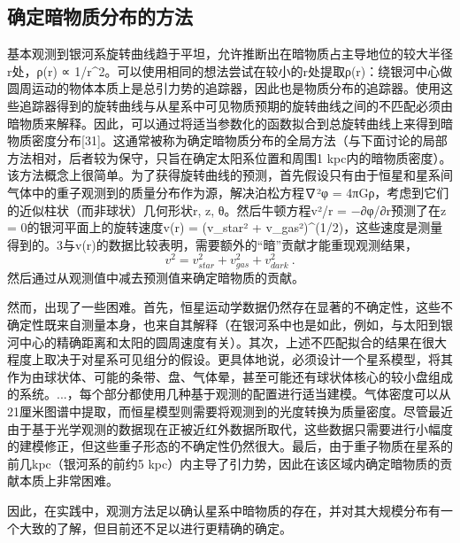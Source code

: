 \subsection{确定暗物质分布的方法} 

基本观测到银河系旋转曲线趋于平坦，允许推断出在暗物质占主导地位的较大半径r处，ρ(r) ∝ 1/r^2。可以使用相同的想法尝试在较小的r处提取ρ(r)：绕银河中心做圆周运动的物体本质上是总引力势的追踪器，因此也是物质分布的追踪器。使用这些追踪器得到的旋转曲线与从星系中可见物质预期的旋转曲线之间的不匹配必须由暗物质来解释。因此，可以通过将适当参数化的函数拟合到总旋转曲线上来得到暗物质密度分布[31]。这通常被称为确定暗物质分布的全局方法（与下面讨论的局部方法相对，后者较为保守，只旨在确定太阳系位置和周围1 kpc内的暗物质密度）。该方法概念上很简单。为了获得旋转曲线的预测，首先假设只有由于恒星和星系间气体中的重子观测到的质量分布作为源，解决泊松方程∇²φ = 4πGρ，考虑到它们的近似柱状（而非球状）几何形状r, z, θ。然后牛顿方程v²/r = −∂φ/∂r预测了在z = 0的银河平面上的旋转速度v(r) = (v_star² + v_gas²)^(1/2)，这些速度是测量得到的。3与v(r)的数据比较表明，需要额外的“暗”贡献才能重现观测结果，
\begin{equation}
v^2 = v_{star}^2 + v_{gas}^2 + v_{dark}^2~.
\end{equation}
然后通过从观测值中减去预测值来确定暗物质的贡献。

然而，出现了一些困难。首先，恒星运动学数据仍然存在显著的不确定性，这些不确定性既来自测量本身，也来自其解释（在银河系中也是如此，例如，与太阳到银河中心的精确距离和太阳的圆周速度有关）。其次，上述不匹配拟合的结果在很大程度上取决于对星系可见组分的假设。更具体地说，必须设计一个星系模型，将其作为由球状体、可能的条带、盘、气体晕，甚至可能还有球状体核心的较小盘组成的系统。...，每个部分都使用几种基于观测的配置进行适当建模。气体密度可以从21厘米图谱中提取，而恒星模型则需要将观测到的光度转换为质量密度。尽管最近由于基于光学观测的数据现在正被近红外数据所取代，这些数据只需要进行小幅度的建模修正，但这些重子形态的不确定性仍然很大。最后，由于重子物质在星系的前几kpc（银河系的前约5 kpc）内主导了引力势，因此在该区域内确定暗物质的贡献本质上非常困难。

因此，在实践中，观测方法足以确认星系中暗物质的存在，并对其大规模分布有一个大致的了解，但目前还不足以进行更精确的确定。 

